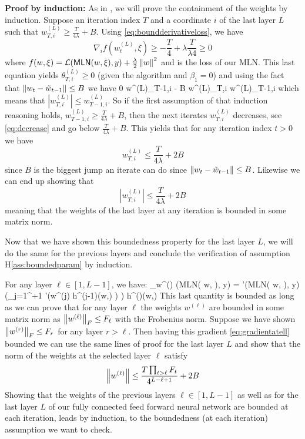 \documentclass[11pt]{article}
\makeatletter
\renewenvironment{proof}[1][\proofname]{%
   \par\pushQED{\qed}\normalfont%
   \topsep6\p@\@plus6\p@\relax
   \trivlist\item[\hskip\labelsep\bfseries#1]%
   \ignorespaces
}{%
   \popQED\endtrivlist\@endpefalse
}
\theoremstyle{k}
\makeatother
\begin{document}
\begin{proof}
\textbf{Proof by induction:} As in \citep{defossez2020convergence}, we will prove the containment of the weights by induction.
Suppose an iteration index $T$ and a coordinate $i$ of the last layer $L$ such that $w^{(L)}_{T, i} \geq \frac{T}{4\lambda} + B$.
Using \eqref{eq:boundderivativeloss}, we have
$$
\nabla_i f(w^{(L)}_t, \xi) \geq - \frac{T}{4} + \lambda \frac{T}{\lambda4} \geq 0
$$
where $f(w, \xi) = \mathcal{L}(\textsf{MLN}( w, \xi), y) +\frac{\lambda}{2}\left\Vert w \right\Vert^2$ and is the loss of our MLN.
This last equation yields $\theta^{(L)}_{T,i} \geq 0$ (given the algorithm and $\beta_1 = 0$) and using the fact that $\left\Vert w_t - \tilde{w}_{t-1} \right\Vert \leq B$ we have
\beq\label{eq:decrease}
0 \leq w^{(L)}_{T-1,i} - B \leq w^{(L)}_{T,i} \leq w^{(L)}_{T-1,i}
\eeq
which means that $| w^{(L)}_{T,i}| \leq w^{(L)}_{T-1,i}$.
So if the first assumption of that induction reasoning holds, \ie $w^{(L)}_{T-1, i} \geq \frac{T}{4\lambda} + B$, then the next iterates $w^{(L)}_{T, i}$ decreases, see \eqref{eq:decrease} and go below $\frac{T}{4\lambda} + B$. This yields that for any iteration index $t >0$ we have 
$$
w^{(L)}_{T, i} \leq \frac{T}{4\lambda} + 2B
$$
since $B$ is the biggest jump an iterate can do since $\left\Vert w_t - \tilde{w}_{t-1} \right\Vert \leq B$.
Likewise we can end up showing that 
$$
|w^{(L)}_{T, i}| \leq \frac{T}{4\lambda} + 2B
$$
meaning that the weights of the last layer at any iteration is bounded in some matrix norm.

Now that we have shown this boundedness property for the last layer $L$, we will do the same for the previous layers and conclude the verification of assumption H\ref{ass:boundedparam} by induction.

For any layer $\ell \in [1, L-1]$, we have:
\beq\label{eq:gradientatell}
\nabla_{w^{(\ell)}}  (\textsf{MLN}( w, \xi), y)  =  '(\textsf{MLN}( w, \xi), y) \left(\prod_{j=1}^{\ell+1} \sigma'\left(w^{(j)} h^{(j-1)}(w,\xi) \right) \right) h^{()}(w,\xi) 
\eeq
This last quantity is bounded as long as we can prove that for any layer $\ell$ the weights $w^{(\ell)}$ are bounded in some matrix norm as $\left\Vert w^{(\ell)} \right\Vert_{F} \leq F_\ell$ with the Frobenius norm.
Suppose we have shown $\left\Vert w^{(r)} \right\Vert_{F} \leq F_r$ for any layer $r > \ell$. 
Then having this gradient \eqref{eq:gradientatell} bounded we can use the same lines of proof for the last layer $L$ and show that the norm of the weights at the selected layer $\ell$ satisfy
$$
\left\Vert w^{(\ell)} \right\Vert \leq \frac{T \prod_{t > \ell} F_t}{4^{L-\ell+1}} + 2B
$$
Showing that the weights of the previous layers $\ell \in [1, L-1]$ as well as for the last layer $L$ of our fully connected feed forward neural network are bounded at each iteration, leads by induction, to the boundedness (at each iteration) assumption we want to check.
\end{proof}
\end{document}
